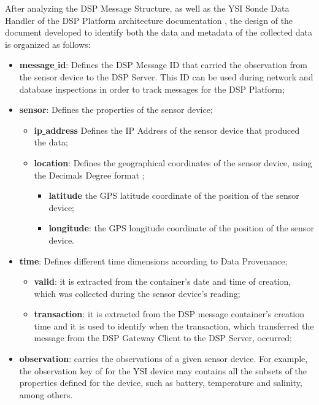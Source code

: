 After analyzing the DSP Message Structure, as well as the YSI Sonde Data
Handler of the DSP Platform architecture documentation
\cite{netbeams-dsp-architecture}, the design of the document developed to
identify both the data and metadata of the collected data is organized as
follows:

\begin{itemize}
  \item \textbf{message\underline{ }id}: Defines the DSP Message ID that
  carried the observation from the sensor device to the DSP Server. This ID
  can be used during network and database inspections in order to track messages
  for the DSP Platform;
  \item \textbf{sensor}: Defines the properties of the sensor device;
    \begin{itemize}[label=\textbullet]
        \item \textbf{ip\underline{ }address} Defines the IP Address of the 
        sensor device that produced the data;
        \item \textbf{location}: Defines the geographical coordinates of the
        sensor device, using the Decimals Degree format \cite{decimal-degrees};
            \begin{itemize}[label=\textbullet]
                \item \textbf{latitude} the GPS latitude coordinate of the
                position of the sensor device;
                \item \textbf{longitude}: the GPS longitude coordinate of the
                position of the sensor device.
            \end{itemize}
    \end{itemize}
  \item \textbf{time}: Defines different time dimensions according to Data 
   Provenance;
    \begin{itemize}[label=\textbullet]
      \item \textbf{valid}: it is extracted from the container's date and time
      of creation, which was collected during the sensor device's reading;
      \item \textbf{transaction}: it is extracted from the DSP message
         container's creation time and it is used to identify when the
         transaction, which transferred the message from the DSP Gateway Client
         to the DSP Server, occurred;
    \end{itemize} 
    \item \textbf{observation}: carries the observations of a given sensor
    device. For example, the observation key of for the YSI device
    \cite{YSI-Sonde} may contains all the subsets of the properties defined
    for the device, such as battery, temperature and salinity, among others.
\end{itemize}

